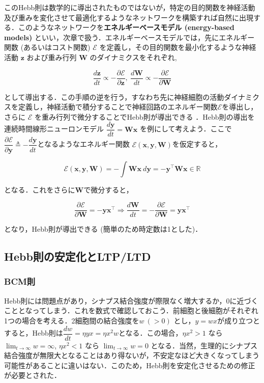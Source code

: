 このHebb則は数学的に導出されたものではないが，特定の目的関数を神経活動及び重みを変化させて最適化するようなネットワークを構築すれば自然に出現する．このようなネットワークを\textbf{エネルギーベースモデル (energy-based models)} といい，次章で扱う．エネルギーベースモデルでは，先にエネルギー関数 (あるいはコスト関数) $\mathcal{E}$ を定義し，その目的関数を最小化するような神経活動 $\mathbf{z}$ および重み行列 $\mathbf{W}$ のダイナミクスをそれぞれ,


\begin{equation}
\frac{d \mathbf{z}}{dt}\propto-\frac{\partial \mathcal{E}}{\partial \mathbf{z}},\ \frac{d \mathbf{W}}{dt}\propto-\frac{\partial \mathcal{E}}{\partial \mathbf{W}}
\end{equation}


として導出する．この手順の逆を行う，すなわち先に神経細胞の活動ダイナミクスを定義し，神経活動で積分することで神経回路のエネルギー関数$\mathcal{E}$を導出し，さらに $\mathcal{E}$ を重み行列で微分することでHebb則が導出できる \cite{Isomura2020-sn}．Hebb則の導出を連続時間線形ニューロンモデル $\dfrac{d\mathbf{y}}{dt}=\mathbf{W}\mathbf{x}$ を例にして考えよう．ここで$\dfrac{\partial\mathcal{E}}{\partial\mathbf{y}}\triangleq-\dfrac{d\mathbf{y}}{dt}$となるようなエネルギー関数 $\mathcal{E}(\mathbf{x}, \mathbf{y}, \mathbf{W})$を仮定すると，


\begin{equation}
\mathcal{E}(\mathbf{x}, \mathbf{y}, \mathbf{W})=-\int \mathbf{W}\mathbf{x}\ d\mathbf{y}=-\mathbf{y}^\top \mathbf{W}\mathbf{x} \in \mathbb{R}
\end{equation}


となる．これをさらに$\mathbf{W}$で微分すると，


\begin{equation}
\dfrac{\partial\mathcal{E}}{\partial\mathbf{W}}=-\mathbf{y}\mathbf{x}^\top\Rightarrow
\frac{d\mathbf{W}}{dt}=-\dfrac{\partial\mathcal{E}}{\partial\mathbf{W}}=\mathbf{y}\mathbf{x}^\top
\end{equation}


となり，Hebb則が導出できる (簡単のため時定数は1とした)．
\subsection{Hebb則の安定化とLTP/LTD}
\subsubsection{BCM則}
Hebb則には問題点があり，シナプス結合強度が際限なく増大するか，0に近づくこととなってしまう．これを数式で確認しておこう．前細胞と後細胞がそれぞれ1つの場合を考える．2細胞間の結合強度を$w\ (>0)$ とし，$y=wx$が成り立つとすると，Hebb則は$\dfrac{dw}{dt}=\eta yx=\eta x^2w$となる．この場合，$\eta x^2>1$ なら $\lim_{t\to\infty} w= \infty$, $\eta x^2<1$ なら $\lim_{t\to\infty} w= 0$ となる．当然，生理的にシナプス結合強度が無限大となることはあり得ないが，不安定なほど大きくなってしまう可能性があることに違いはない．このため，Hebb則を安定化させるための修正が必要とされた．

